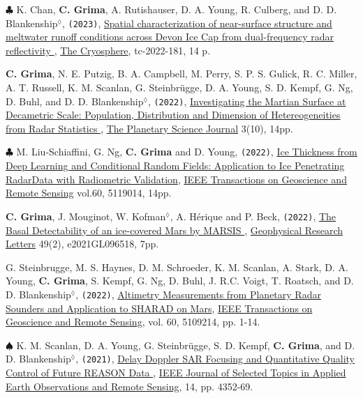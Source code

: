 \begin{etaremune}
\item
  $\clubsuit$ K. Chan, \textbf{C. Grima}, A. Rutishauser, D. A. Young, R. Culberg, and D. D. Blankenship$^\lozenge$, \texttt{(2023)}, \href{https://tc.copernicus.org/preprints/tc-2022-181/}{Spatial characterization of near-surface structure and meltwater runoff conditions across Devon Ice Cap from dual-frequency radar reflectivity \aiOpenAccessSquare}, \ul{The Cryosphere}, tc-2022-181, 14 p.

\item
  \textbf{C. Grima}, N. E. Putzig, B. A. Campbell, M. Perry, S. P. S. Gulick, R. C. Miller, A. T. Russell, K. M. Scanlan, G. Steinbrügge, D. A. Young, S. D. Kempf, G. Ng, D. Buhl, and D. D. Blankenship$^\lozenge$, \texttt{(2022)}, \href{https://doi.org/10.3847/PSJ/ac9277}{Investigating the Martian Surface at Decametric Scale: Population, Distribution and Dimension of Hetereogeneities from Radar Statistics \aiOpenAccessSquare}, \ul{The Planetary Science Journal} 3(10), 14pp.

\item
  $\clubsuit$ M. Liu-Schiaffini, G. Ng, \textbf{C. Grima} and D. Young, \texttt{(2022)}, \href{https://ieeexplore.ieee.org/document/9916288}{Ice Thickness from Deep Learning and Conditional Random Fields: Application to Ice Penetrating RadarData with Radiometric Validation}, \ul{IEEE Transactions on Geoscience and Remote Sensing} vol.60, 5119014, 14pp.

\item
  \textbf{C. Grima}, J. Mouginot, W. Kofman$^\lozenge$, A. Hérique and P. Beck, \texttt{(2022)}, \href{https://doi.org/10.1029/2021GL096518}{The Basal Detectability of an ice-covered Mars by MARSIS \aiOpenAccessSquare}, \ul{Geophysical Research Letters} 49(2), e2021GL096518, 7pp.
  
\item
  G. Steinbrugge, M. S. Haynes, D. M. Schroeder, K. M. Scanlan, A. Stark, D. A. Young, \textbf{C. Grima}, S. Kempf, G. Ng, D. Buhl, J. R.C. Voigt, T. Roatsch, and D. D. Blankenship$^\lozenge$, \texttt{(2022)}, \href{https://doi.org/10.1109/TGRS.2021.3134638}{Altimetry Measurements from Planetary Radar Sounders and Application to SHARAD on Mars}, \ul{IEEE Transactions on Geoscience and Remote Sensing}, vol. 60, 5109214,  pp. 1-14.
  
\item
  $\spadesuit$ K. M. Scanlan, D. A. Young, G. Steinbrügge, S. D. Kempf, \textbf{C. Grima}, and D. D. Blankenship$^\lozenge$, \texttt{(2021)}, \href{https://ieeexplore.ieee.org/document/9399772?source=authoralert}{Delay Doppler SAR Focusing and Quantitative Quality Control of Future REASON Data \aiOpenAccessSquare}, \ul{IEEE Journal of Selected Topics in Applied Earth Observations and Remote Sensing}, 14, pp. 4352-69.


\end{etaremune}
